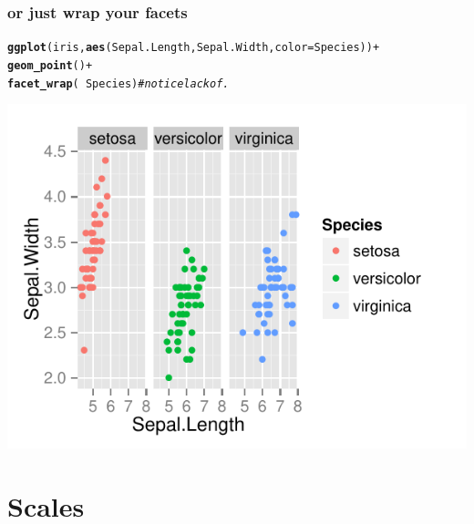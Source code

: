 \documentclass{beamer}\usepackage[]{graphicx}\usepackage[]{color}
\makeatletter
\newcommand{\hlcom}[1]{\textcolor[rgb]{0.678,0.584,0.686}{\textit{#1}}}%
\newcommand{\hlopt}[1]{\textcolor[rgb]{0,0,0}{#1}}%
\newcommand{\hlstd}[1]{\textcolor[rgb]{0.345,0.345,0.345}{#1}}%
\newcommand{\hlkwc}[1]{\textcolor[rgb]{0.333,0.667,0.333}{#1}}%
\newcommand{\hlkwd}[1]{\textcolor[rgb]{0.737,0.353,0.396}{\textbf{#1}}}%
\newenvironment{kframe}{%
 \def\at@end@of@kframe{}%
 \ifinner\ifhmode%
  \def\at@end@of@kframe{\end{minipage}}%
  \begin{minipage}{\columnwidth}%
 \fi\fi%
 \def\FrameCommand##1{\hskip\@totalleftmargin \hskip-\fboxsep
 \colorbox{shadecolor}{##1}\hskip-\fboxsep
     \hskip-\linewidth \hskip-\@totalleftmargin \hskip\columnwidth}%
 \MakeFramed {\advance\hsize-\width
   \@totalleftmargin\z@ \linewidth\hsize
   \@setminipage}}%
 {\par\unskip\endMakeFramed%
 \at@end@of@kframe}
\newenvironment{knitrout}{}{} %
\makeatother
\begin{document}
\begin{frame}[fragile]
\frametitle{or just wrap your facets}
\begin{knitrout}\footnotesize
{}\color{fgcolor}\begin{kframe}
\begin{alltt}
\hlkwd{ggplot}\hlstd{(iris,} \hlkwd{aes}\hlstd{(Sepal.Length, Sepal.Width,} \hlkwc{color} \hlstd{= Species))} \hlopt{+}
\hlkwd{geom_point}\hlstd{()} \hlopt{+}
\hlkwd{facet_wrap}\hlstd{(} \hlopt{~} \hlstd{Species)} \hlcom{# notice lack of .}
\end{alltt}
\end{kframe}

{\centering \includegraphics[width=.75\linewidth]{figure/facet_wrap} 

}



\end{knitrout}

\end{frame}


\section*{Scales}
\frame{\sectionpage}

\end{document}
